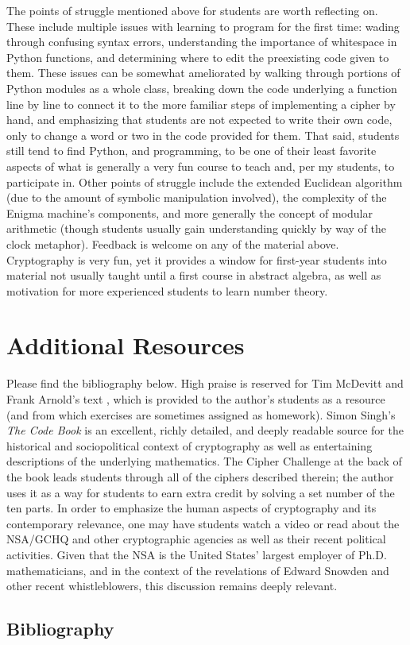\documentclass[11pt]{article}
\theoremstyle{plain}
\theoremstyle{remark}
\theoremstyle{definition}
\theoremstyle{definition}
\theoremstyle{definition}
\theoremstyle{plain}
\theoremstyle{plain}
\theoremstyle{plain}
\theoremstyle{definition}
\begin{document}
The points of struggle mentioned above for students are worth reflecting
on. These include multiple issues with learning to program for the
first time: wading through confusing syntax errors, understanding
the importance of whitespace in Python functions, and determining
where to edit the preexisting code given to them. These issues can be
somewhat ameliorated by walking through portions of Python modules
as a whole class, breaking down the code underlying a function line
by line to connect it to the more familiar steps of implementing a
cipher by hand, and emphasizing that students are not expected to
write their own code, only to change a word or two in the code provided
for them. That said, students still tend to find Python, and programming,
to be one of their least favorite aspects of what is generally a very
fun course to teach and, per my students, to participate in. Other
points of struggle include the extended Euclidean algorithm (due to
the amount of symbolic manipulation involved), the complexity of the
Enigma machine's components, and more generally the concept of modular
arithmetic (though students usually gain understanding quickly by
way of the clock metaphor). Feedback is welcome on any of the material
above. Cryptography is very fun, yet it provides a window for first-year students into material
not usually taught until a first course in abstract algebra, as well
as motivation for more experienced students to learn number theory.

\section{Additional Resources}

Please find the bibliography below. High praise is reserved for
Tim McDevitt and Frank Arnold's text \cite{mcdevittClassNotesCryptologic2012},
which is provided to the author's students as a resource (and from which 
exercises are sometimes assigned as homework). Simon Singh's \emph{The Code Book }\cite{singhCodeBookScience2011}
is an excellent, richly detailed, and deeply readable source for the
historical and sociopolitical context of cryptography as well as entertaining
descriptions of the underlying mathematics. The Cipher Challenge at
the back of the book leads students through all of the ciphers described
therein; the author uses it as a way for students to earn extra credit by solving
a set number of the ten parts. In order to emphasize the human aspects
of cryptography and its contemporary relevance, one may have students watch
a video or read about the NSA/GCHQ and other cryptographic agencies
as well as their recent political activities. Given that the NSA is
the United States' largest employer of Ph.D. mathematicians, and in
the context of the revelations of Edward Snowden and other recent
whistleblowers, this discussion remains deeply relevant.

\subsection{Bibliography}



\end{document}

